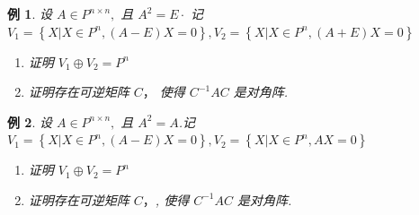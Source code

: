 \documentclass[13pt]{beamer}
\newtheorem{exa}{例}
\begin{document}
\begin{frame}
\begin{exa}
设 $A \in P^{n \times n},$ 且 $A^{2}=E \cdot$ 记 $V_{1}=\left\{X | X \in P^{n},(A-E) X=0\right\}, V_{2}=\left\{X | X \in P^{n},(A+E) X=0\right\}$
\begin{enumerate}
\item  证明 $V_{1} \oplus V_{2}=P^{n}$
\item 证明存在可逆矩阵 $C ，$ 使得 $C^{-1} A C$ 是对角阵.
\end{enumerate}
\end{exa} 
\begin{exa}
设 $A \in P^{n \times n},$ 且 $A^{2}=A$.记 $V_{1}=\left\{X | X \in P^{n},(A-E) X=0\right\}, V_{2}=\left\{X | X \in P^{n}, A X=0\right\}$
\begin{enumerate}
\item  证明 $V_{1} \oplus V_{2}=P^{n}$
\item 证明存在可逆矩阵 $C ，$, 使得 $C^{-1} A C$ 是对角阵.
\end{enumerate}
\end{exa}
\end{frame}
\end{document}
